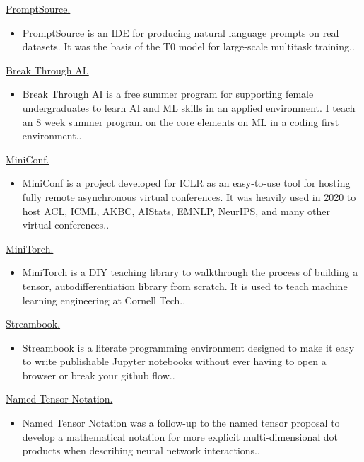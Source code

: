 \documentclass[10pt]{article}
\begin{document}
\ind \href{ paper.link } { PromptSource. }
\begin{itemize}
	\item PromptSource is an IDE for producing natural language prompts on real datasets. It was the basis of the T0 model for large-scale multitask training..
\end{itemize}
\medskip


\ind \href{ paper.link } { Break Through AI. }
\begin{itemize}
	\item Break Through AI is a free summer program for supporting female undergraduates to learn AI and ML skills in an applied environment. I teach an 8 week summer program on the core elements on ML in a coding first environment..
\end{itemize}
\medskip


\ind \href{ paper.link } { MiniConf. }
\begin{itemize}
	\item MiniConf is a project developed for ICLR as an easy-to-use tool for hosting fully remote asynchronous virtual conferences. It was heavily used in 2020 to host ACL, ICML, AKBC, AIStats, EMNLP, NeurIPS, and many other virtual conferences..
\end{itemize}
\medskip


\ind \href{ paper.link } { MiniTorch. }
\begin{itemize}
	\item MiniTorch is a DIY teaching library to walkthrough the process of building a tensor, autodifferentiation library from scratch. It is used to teach machine learning engineering at Cornell Tech..
\end{itemize}
\medskip


\ind \href{ paper.link } { Streambook. }
\begin{itemize}
	\item Streambook is a literate programming environment designed to make it easy to write publishable Jupyter notebooks without ever having to open a browser or break your github flow..
\end{itemize}
\medskip


\ind \href{ paper.link } { Named Tensor Notation. }
\begin{itemize}
	\item Named Tensor Notation was a follow-up to the named tensor proposal to develop a mathematical notation for more explicit multi-dimensional dot products when describing neural network interactions..
\end{itemize}
\medskip
\end{document}
